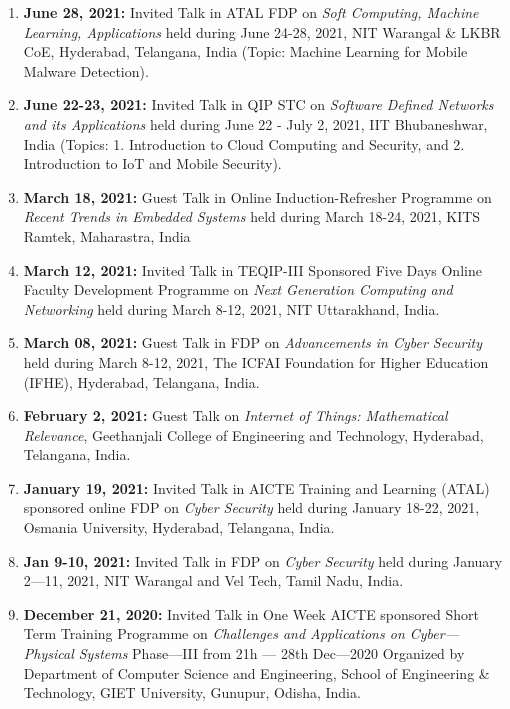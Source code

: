 \begin{enumerate}
\item
\textbf{June 28, 2021:} Invited Talk in ATAL FDP on \textit{Soft Computing, Machine Learning, Applications} held during June 24-28, 2021, NIT Warangal \& LKBR CoE, Hyderabad, Telangana, India (Topic: Machine Learning for Mobile Malware Detection).

\item
\textbf{June 22-23, 2021:} Invited Talk in QIP STC on \textit{Software Defined Networks and its Applications} held during June 22 - July 2, 2021, IIT Bhubaneshwar, India (Topics: 1. Introduction to Cloud Computing and Security, and 2. Introduction to IoT and Mobile Security).

\item 
\textbf{March 18, 2021:} Guest Talk in Online Induction-Refresher Programme on \textit{Recent Trends in Embedded Systems} held during March 18-24, 2021, KITS Ramtek, Maharastra, India
\item
\textbf{March 12, 2021:} Invited Talk in TEQIP-III Sponsored Five Days Online Faculty Development Programme on \textit{Next Generation Computing and Networking} held during March 8-12, 2021, NIT Uttarakhand, India. 

\item
\textbf{March 08, 2021:} Guest Talk in FDP on \textit{Advancements in Cyber Security} held during March 8-12, 2021, The ICFAI Foundation for Higher Education (IFHE), Hyderabad, Telangana, India.

\item
\textbf{February 2, 2021:} Guest Talk on \textit{Internet of Things: Mathematical Relevance}, Geethanjali College of Engineering and Technology, Hyderabad, Telangana, India.

\item
\textbf{January 19, 2021:} Invited Talk in AICTE Training and Learning (ATAL) sponsored online FDP on \textit{Cyber Security} held during January 18-22, 2021, Osmania University, Hyderabad, Telangana, India.

\item
\textbf{Jan 9-10, 2021:} Invited Talk in FDP on \textit{Cyber Security} held during January 2—11, 2021, NIT Warangal and Vel Tech, Tamil Nadu, India.

\item
\textbf{December 21, 2020:} Invited Talk in One Week AICTE sponsored Short Term Training Programme on \textit{Challenges and Applications on Cyber—Physical Systems} Phase—III from 21h — 28th Dec—2020 Organized by Department of Computer Science and Engineering, School of Engineering \& Technology, GIET University, Gunupur, Odisha, India.


\end{enumerate}
